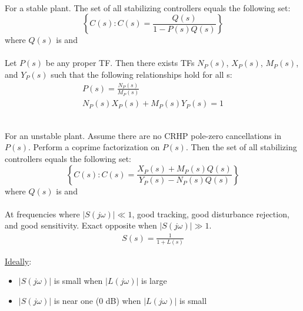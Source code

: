 \documentclass[12pt]{article}
\begin{document}
\begin{multicols*}{2}
    \underline{} \\
    For a stable plant. The set of all stabilizing controllers equals the following set:
    \[
        \left\{
        C(s) : C(s) = \frac{ Q(s) }{ 1 - P(s) Q(s) }
        \right\}
    \]
    where \( Q(s) \) is \underline{} and \underline{} \\

    \underline{} \\
    Let \( P(s) \) be any proper TF. Then there exists \underline{}
    \underline{} TFs \( N_P(s) \), \( X_P(s) \), \( M_P(s) \), and \( Y_P(s) \)
    such that the following relationships hold for all s:
    \begin{gather*}
        P(s) = \frac{ N_P(s) }{ M_P(s) }\\
        N_P(s) X_P(s) + M_P(s) Y_P(s) = 1
    \end{gather*}

    \underline{} \\
    For an unstable plant. Assume there are no CRHP pole-zero cancellations in \( P(s) \).
    Perform a coprime factorization on \( P(s) \).
    Then the set of all stabilizing controllers equals the following set:
    \[
        \left\{
        C(s) : C(s) = \frac{ X_P(s) + M_P(s)Q(s) }{ Y_P(s) - N_P(s) Q(s) }
        \right\}
    \]
    where \( Q(s) \) is \underline{} and \underline{} \\

    \underline{} \\
    At frequencies where \( | S(j\omega) | \ll 1 \),
    good tracking, good disturbance rejection, and good sensitivity. Exact opposite when
    \( | S(j\omega) | \gg 1 \).
    \begin{gather*}
        S(s) = \frac{ 1 }{ 1 + L(s) }
    \end{gather*}

    \underline{Ideally}:
    \begin{itemize}
        \item \( |S(j\omega)| \) is small when \( |L(j\omega)| \) is large
        \item \( |S(j\omega)| \) is near one (0 dB) when \( |L(j\omega)| \) is small
    \end{itemize}


\end{multicols*}
\end{document}
